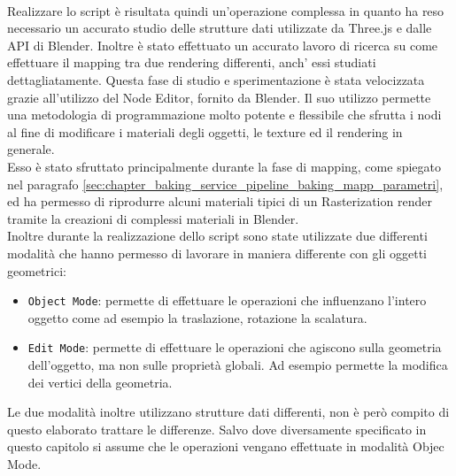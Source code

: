 \\
Realizzare lo script è risultata quindi un’operazione complessa in quanto ha reso necessario un accurato studio delle strutture dati utilizzate da Three.js e dalle API di Blender.
Inoltre è stato effettuato un accurato lavoro di ricerca su come effettuare il mapping tra due rendering differenti, anch’ essi studiati dettagliatamente.
Questa fase di studio e sperimentazione è stata velocizzata grazie all’utilizzo del Node Editor, fornito da Blender.
Il suo utilizzo permette una metodologia di programmazione molto potente e flessibile che sfrutta i nodi al fine di modificare i materiali degli oggetti, le texture ed il rendering in generale.
\\
Esso è stato sfruttato principalmente durante la fase di mapping, come spiegato nel paragrafo \ref{sec:chapter_baking_service_pipeline_baking_mapp_parametri}, ed ha permesso di riprodurre alcuni materiali tipici di un Rasterization render tramite la creazioni di complessi materiali in Blender.
\\
Inoltre durante la realizzazione dello script sono state utilizzate due differenti modalità che hanno permesso di lavorare in maniera differente con gli oggetti geometrici:
\begin{itemize}
\item \texttt{Object Mode}: permette di effettuare le operazioni che influenzano l’intero oggetto come ad esempio la traslazione, rotazione la scalatura.
\item \texttt{Edit Mode}: permette di effettuare le operazioni che agiscono sulla geometria dell’oggetto, ma non sulle proprietà globali. Ad esempio permette la modifica dei vertici della geometria.
\end{itemize}
Le due modalità inoltre utilizzano strutture dati differenti, non è però compito di questo elaborato trattare le differenze.
Salvo dove diversamente specificato in questo capitolo si assume che le operazioni vengano effettuate in modalità Objec Mode. 


